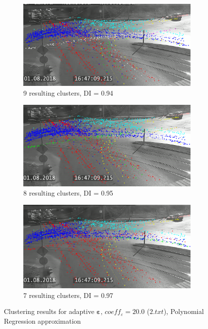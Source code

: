 \begin{figure}[!htb]
	\centering
	\begin{subfigure}[!htb]{0.495\textwidth}
		\centering{}
		\includegraphics[width=\textwidth]{images/9cl-di-94.png}
		\caption{9 resulting clusters, DI = 0.94}
		\label{fig:9cl-di-94}
	\end{subfigure}
	\hfill
	\begin{subfigure}[!htb]{0.495\textwidth}
		\centering{}
		\includegraphics[width=\textwidth]{images/8cl-di-95.png}
		\caption{8 resulting clusters, DI = 0.95}
		\label{fig:8cl-di-95}
	\end{subfigure}
	\hfill
	\begin{subfigure}[!htb]{0.495\textwidth}
		\centering{}
		\includegraphics[width=\textwidth]{images/7cl-di-97.png}
		\caption{7 resulting clusters, DI = 0.97}
		\label{fig:7cl-di-97}
	\end{subfigure}
	\caption{Clustering results for adaptive $\bm{\varepsilon}$, $coeff_\varepsilon = 20.0$ ($2.txt$), Polynomial Regression approximation}
	\label{fig:clust-res-2}
\end{figure}

